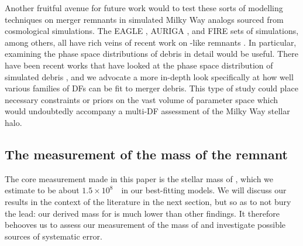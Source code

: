 Another fruitful avenue for future work would to test these sorts of modelling techniques on merger remnants in simulated Milky Way analogs sourced from cosmological simulations. The EAGLE \parencite{schaye15}, AURIGA \parencite{grand17}, and FIRE \parencite{wetzel16} sets of simulations, among others, all have rich veins of recent work on \gse-like remnants \parencite[e.g.][]{fattahi19,mackereth19a,horta23b,orkney23}. In particular, examining the phase space distributions of debris in detail would be useful. There have been recent works that have looked at the phase space distribution of simulated debris \parencite[e.g.][]{amorisco17,jean-baptiste17,naidu21,amarante22,orkney23,carrillo23}, and we advocate a more in-depth look specifically at how well various families of DFs can be fit to merger debris. This type of study could place necessary constraints or priors on the vast volume of parameter space which would undoubtedly accompany a multi-DF assessment of the Milky Way stellar halo.

\subsection{The measurement of the mass of the \gse remnant}

The core measurement made in this paper is the stellar mass of \gse, which we estimate to be about $1.5\times10^{8}$~\Msun\ in our best-fitting models. We will discuss our results in the context of the literature in the next section, but so as to not bury the lead: our derived mass for \gse is much lower than other findings. It therefore behooves us to assess our measurement of the mass of \gse and investigate possible sources of systematic error.

